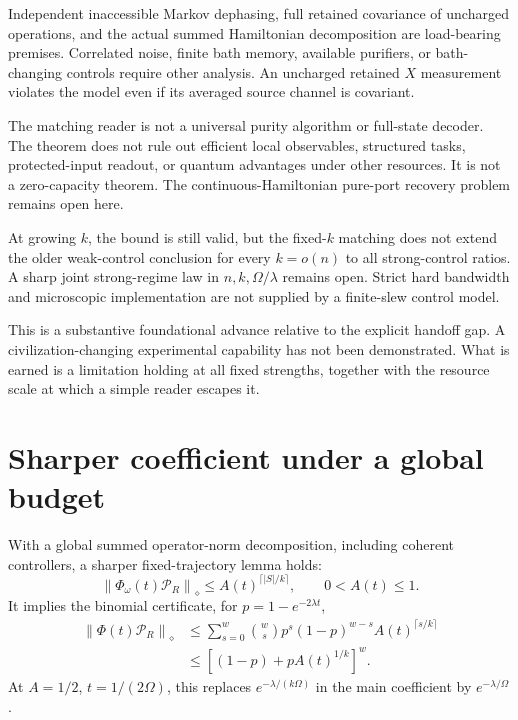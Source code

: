 \documentclass[11pt,a4paper]{article}
\newcommand{\norm}[1]{\left\lVert #1\right\rVert}
\newcommand{\Pcal}{\mathcal P}
\begin{document}
Independent inaccessible Markov dephasing, full retained covariance of uncharged operations, and the actual summed Hamiltonian decomposition are load-bearing premises. Correlated noise, finite bath memory, available purifiers, or bath-changing controls require other analysis. An uncharged retained $X$ measurement violates the model even if its averaged source channel is covariant.

The matching reader is not a universal purity algorithm or full-state decoder. The theorem does not rule out efficient local observables, structured tasks, protected-input readout, or quantum advantages under other resources. It is not a zero-capacity theorem. The continuous-Hamiltonian pure-port recovery problem remains open here.

At growing $k$, the bound is still valid, but the fixed-$k$ matching does not extend the older weak-control conclusion for every $k=o(n)$ to all strong-control ratios. A sharp joint strong-regime law in $n,k,\Omega/\lambda$ remains open. Strict hard bandwidth and microscopic implementation are not supplied by a finite-slew control model.

This is a substantive foundational advance relative to the explicit handoff gap. A civilization-changing experimental capability has not been demonstrated. What is earned is a limitation holding at all fixed strengths, together with the resource scale at which a simple reader escapes it.

\clearpage
\appendix
\section{Sharper coefficient under a global budget}
\label{app:sharp}

With a global summed operator-norm decomposition, including coherent controllers, a sharper fixed-trajectory lemma holds:
\begin{equation}
 \boxed{\norm{\Phi_\omega(t)\Pcal_R}_\diamond
 \le A(t)^{\lceil |S|/k\rceil},\qquad0<A(t)\le1.}
 \label{eq:sharplemma}
\end{equation}
It implies the binomial certificate, for $p=1-e^{-2\lambda t}$,
\begin{align}
 \norm{\Phi(t)\Pcal_R}_\diamond
 &\le\sum_{s=0}^w\binom ws p^s(1-p)^{w-s}A(t)^{\lceil s/k\rceil}\nonumber\\
 &\le[(1-p)+pA(t)^{1/k}]^w.
\end{align}
At $A=1/2$, $t=1/(2\Omega)$, this replaces $e^{-\lambda/(k\Omega)}$ in the main coefficient by $e^{-\lambda/\Omega}$.
\end{document}
